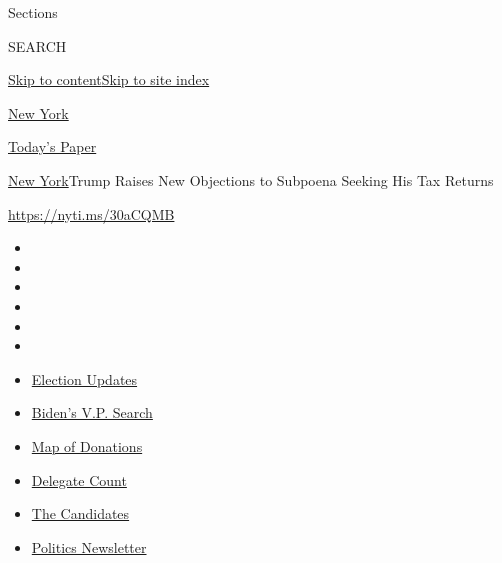 Sections

SEARCH

\protect\hyperlink{site-content}{Skip to
content}\protect\hyperlink{site-index}{Skip to site index}

\href{https://www.nytimes.com/section/nyregion}{New York}

\href{https://myaccount.nytimes.com/auth/login?response_type=cookie\&client_id=vi}{}

\href{https://www.nytimes.com/section/todayspaper}{Today's Paper}

\href{/section/nyregion}{New York}\textbar{}Trump Raises New Objections
to Subpoena Seeking His Tax Returns

\url{https://nyti.ms/30aCQMB}

\begin{itemize}
\item
\item
\item
\item
\item
\item
\end{itemize}

\begin{itemize}
\item
  \href{https://www.nytimes.com/2020/08/03/us/elections/biden-vs-trump.html?action=click\&pgtype=Article\&state=default\&region=TOP_BANNER\&context=storylines_menu}{Election
  Updates}
\item
  \href{https://www.nytimes.com/article/biden-vice-president-2020.html?action=click\&pgtype=Article\&state=default\&region=TOP_BANNER\&context=storylines_menu}{Biden's
  V.P. Search}
\item
  \href{https://www.nytimes.com/interactive/2020/07/24/us/politics/trump-biden-campaign-donors.html?action=click\&pgtype=Article\&state=default\&region=TOP_BANNER\&context=storylines_menu}{Map
  of Donations}
\item
  \href{https://www.nytimes.com/interactive/2020/us/elections/delegate-count-primary-results.html?action=click\&pgtype=Article\&state=default\&region=TOP_BANNER\&context=storylines_menu}{Delegate
  Count}
\item
  \href{https://www.nytimes.com/interactive/2019/us/politics/2020-presidential-candidates.html?action=click\&pgtype=Article\&state=default\&region=TOP_BANNER\&context=storylines_menu}{The
  Candidates}
\item
  \href{https://www.nytimes.com/newsletters/politics?action=click\&pgtype=Article\&state=default\&region=TOP_BANNER\&context=storylines_menu}{Politics
  Newsletter}
\end{itemize}

